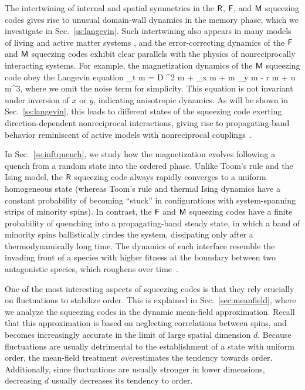 \documentclass[pra,aps,twocolumn,groupedaddress,superscriptaddress,nofootinbib,preprintnumbers]{revtex4-2}
\begin{document}
    The intertwining of internal and spatial symmetries in the $\mathsf{R}$, $\mathsf{F}$, and $\mathsf{M}$ squeezing codes gives rise to unusual domain-wall dynamics in the memory phase, which we investigate in Sec.~\ref{ss:langevin}. 
    Such intertwining also appears in many models of living and active matter systems \cite{bowick2022symmetry,fruchart2021non,dinelli2023non,o2006fisher,giometto2021antagonism}, and the error-correcting dynamics of the $\mathsf{F}$ and $\mathsf{M}$ squeezing codes exhibit clear parallels with the physics of nonreciprocally interacting systems. 
    For example, the magnetization dynamics of the $\mathsf{M}$ squeezing code obey the Langevin equation
    \be \partial_t m = D \nabla^2 m + \gamma \partial_x m + \lambda m \partial_y m - r m + u m^3, \ee 
    where we omit the noise term for simplicity. This equation is not invariant under inversion of $x$ or $y$, indicating anisotropic dynamics. As will be shown in Sec.~\ref{ss:langevin}, this leads to different states of the squeezing code exerting direction-dependent nonreciprocal interactions, giving rise to propagating-band behavior reminiscent of active models with nonreciprocal couplings~\cite{dinelli2023non}. 

    In Sec.~\ref{ss:inftquench}, we study how the magnetization evolves following a quench from a random state into the ordered phase. Unlike Toom’s rule and the Ising model, the $\mathsf{R}$ squeezing code always rapidly converges to a uniform homogeneous state (whereas Toom’s rule and thermal Ising dynamics have a constant probability of becoming ``stuck'' in configurations with system-spanning strips of minority spins). In contrast, the $\mathsf{F}$ and $\mathsf{M}$ squeezing codes have a finite probability of quenching into a propagating-band steady state, in which a band of minority spins ballistically circles the system, dissipating only after a thermodynamically long time. The dynamics of each interface resemble the invading front of a species with higher fitness at the boundary between two antagonistic species, which roughens over time~\cite{o2006fisher,giometto2021antagonism}. 
	
	
	One of the most interesting aspects of squeezing codes is that they rely crucially on fluctuations to stabilize order. This is explained in Sec.~\ref{sec:meanfield}, where we analyze the squeezing codes in the dynamic mean-field approximation. Recall that this approximation is based on neglecting correlations between spins, and becomes increasingly accurate in the limit of large spatial dimension $d$. Because fluctuations are usually detrimental to the establishment of a state with uniform order, the mean-field treatment {\it over}estimates the tendency towards order. 
	Additionally, since fluctuations are usually stronger in lower dimensions, decreasing $d$ usually decreases its tendency to order. 
	
\end{document}
